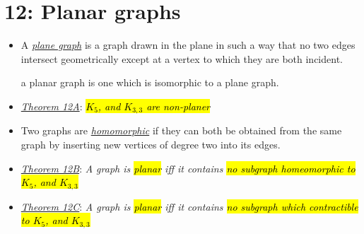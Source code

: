 \documentclass[12pt,a4paper, twocolumn]{article}
\begin{document}
\section*{12: Planar graphs}
\begin{itemize}
		\item A \underline{\emph{\color{magenta} plane graph}} is a graph drawn in the plane in such a way that no two edges intersect geometrically except at a vertex to which they are both incident. \begin{small} a planar graph is one which is isomorphic to a plane graph.\end{small}
				\item \underline{\emph{\color{magenta} Theorem 12A}}: \emph{\hl{$K_5$, and $K_{3,3}$ are non-planer}}
				\item Two graphs are \underline{\emph{\color{magenta} homomorphic}} if they can both be obtained from the same graph by inserting new vertices of degree two into its edges.
				\item \underline{\emph{\color{magenta} Theorem 12B}}: \emph{A graph is \hl{planar} iff it contains \hl{no subgraph homeomorphic to $K_5$, and $K_{3,3}$}}
				\item \underline{\emph{\color{magenta} Theorem 12C}}: \emph{A graph is \hl{planar} iff it contains \hl{no subgraph which contractible to $K_5$, and $K_{3,3}$}}


\end{itemize}
\end{document}
